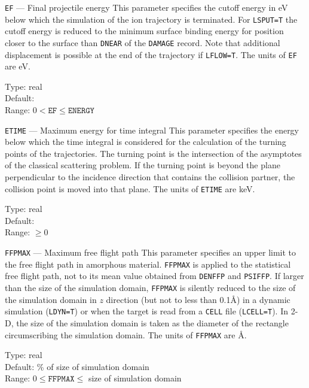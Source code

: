 \begin{keydescription}{\texttt{EF} --- Final projectile energy}
%
  This parameter specifies the cutoff energy in eV below which the
  simulation of the ion trajectory is terminated. For \texttt{LSPUT=T} the
  cutoff energy is reduced to the minimum surface binding energy for position
  closer to the surface than \texttt{DNEAR} of the \texttt{DAMAGE} record.
  Note that additional displacement is possible at the end of the trajectory if
  \texttt{LFLOW=T}. The units of \texttt{EF} are eV. 
  \begin{keytab}
    Type:    \> real \\
    Default:  \\
    Range:   \> $0 < \texttt{EF} \le \texttt{ENERGY}$
  \end{keytab}
\end{keydescription}

\begin{keydescription}{\texttt{ETIME} --- Maximum energy for time integral}
%
  This parameter specifies the energy below which the time
  integral is considered for the calculation of the turning points of
  the trajectories. The turning point is the intersection of the asymptotes
  of the classical scattering problem. If the turning point is beyond the
  plane perpendicular to the incidence direction that contains the collision
  partner, the collision point is moved into that plane. The units of
  \texttt{ETIME} are keV.
  \begin{keytab}
    Type:    \> real \\
    Default:  \\
    Range:   \> $\ge 0$
  \end{keytab}
\end{keydescription}

\begin{keydescription}{\texttt{FFPMAX} --- Maximum free flight path}
%
  This parameter specifies an upper limit to the free flight path in amorphous
  material.  \texttt{FFPMAX} is applied to the statistical free flight path, not
  to its mean value obtained from \texttt{DENFFP} and \texttt{PSIFFP}. If larger
  than the size of the simulation domain, \texttt{FFPMAX} is silently reduced to
  the size of the simulation domain in $z$ direction (but not to less than
  0.1\AA) in a dynamic simulation (\texttt{LDYN=T}) or when the target is read
  from a \texttt{CELL} file (\texttt{LCELL=T}). In 2-D, the size of
  the simulation domain is taken as the diameter of the rectangle
  circumscribing the simulation domain. The units of \texttt{FFPMAX} are \AA.
  \begin{keytab}
    Type:    \> real \\
    Default: \% of size of simulation domain \\
    Range:   \> $0 \le \texttt{FFPMAX} \le$ size of simulation domain
  \end{keytab}
\end{keydescription}

